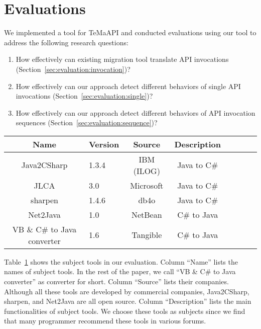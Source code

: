 \section{Evaluations}
\label{sec:evaluation}

We implemented a tool for TeMaAPI and
conducted evaluations using our tool to address the following
research questions:

\begin{enumerate}
\item How effectively can existing migration tool translate API invocations (Section~\ref{sec:evaluation:invocation})? \vspace*{-1.8ex}
\item How effectively can our approach detect different behaviors of single API invocations (Section~\ref{sec:evaluation:single})? \vspace*{-1.8ex}
\item How effectively can our approach detect different behaviors of API invocation sequences (Section~\ref{sec:evaluation:sequence})?
\end{enumerate}%

\begin{table}[t]
\centering
\begin{SmallOut}
\begin {tabular} {|c|l|c|c|c|c|c|c|}
 \hline
\textbf{Name}& \textbf{Version}& \textbf{Source} &\textbf{Description}\\
\hline
Java2CSharp  &  1.3.4 & IBM (ILOG) & Java to C\# \\
\hline
JLCA         &  3.0   & Microsoft  & Java to C\# \\
\hline
sharpen      &  1.4.6 & db4o       & Java to C\# \\
\hline
Net2Java     &  1.0   & NetBean    &  C\# to Java\\
\hline
VB \& C\# to Java converter    &  1.6   & Tangible   &  C\# to Java\\
\hline
\end{tabular}\vspace*{-2ex}
 \label{table:subjects}
\end{SmallOut}\vspace*{-2ex}
\end{table}

Table~\ref{table:subjects} shows the subject tools in our evaluation. Column ``Name'' lists the names of subject tools. In the rest of the paper, we call ``VB \& C\# to Java converter'' as converter for short. Column ``Source'' lists their companies. Although all these tools are developed by commercial companies, Java2CSharp, sharpen, and Net2Java are all open source. Column ``Description'' lists the main functionalities of subject tools. We choose these tools as subjects since we find that many programmer recommend these tools in various forums.

